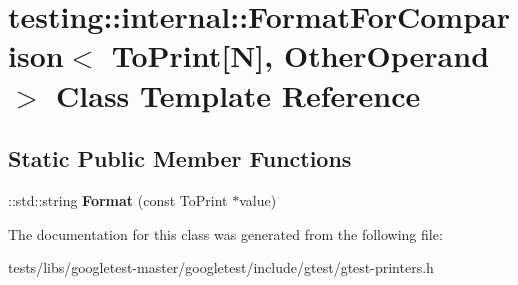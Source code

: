 \hypertarget{classtesting_1_1internal_1_1FormatForComparison_3_01ToPrint[N]_00_01OtherOperand_01_4}{}\section{testing\+:\+:internal\+:\+:Format\+For\+Comparison$<$ To\+Print\mbox{[}N\mbox{]}, Other\+Operand $>$ Class Template Reference}
\label{classtesting_1_1internal_1_1FormatForComparison_3_01ToPrint[N]_00_01OtherOperand_01_4}
\subsection*{Static Public Member Functions}
\begin{DoxyCompactItemize}
\item 
\mbox{\label{classtesting_1_1internal_1_1FormatForComparison_3_01ToPrint[N]_00_01OtherOperand_01_4_a76c526461c8fa7df75f7b32ab889b9e0}} 
\+::std\+::string {\bfseries Format} (const To\+Print $\ast$value)
\end{DoxyCompactItemize}


The documentation for this class was generated from the following file\+:\begin{DoxyCompactItemize}
\item 
tests/libs/googletest-\/master/googletest/include/gtest/gtest-\/printers.\+h\end{DoxyCompactItemize}
